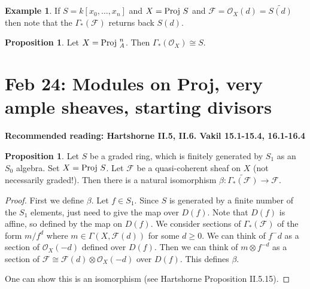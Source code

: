 \documentclass[10pt,reqno]{amsart}
\theoremstyle{definition}
\newtheorem{example}[theorem]{Example}
\newtheorem{proposition}[theorem]{Proposition}
\theoremstyle{remark}
\numberwithin{equation}{section}
\numberwithin{theorem}{section}
\newcommand{\OO}{{\mathcal O}}
\newcommand{\spec}{\textup{Spec }}
\newcommand{\Hom}{\textup{Hom}}
\newcommand{\proj}{\textup{Proj }}
\newcommand{\FF}{{\mathscr F}}
\newcommand{\wt}{\widetilde}
\begin{document}
\begin{example}
If $S = k[x_0,\dots,x_n]$ and $X = \proj S$ and $\FF = \OO_{X}(d) = \wt{S(d)}$ then note that the $\Gamma_*(\FF)$ returns back $S(d)$.
\end{example}

\begin{proposition} Let $X = \proj^n_A$. Then $\Gamma_*(\OO_X) \cong S$.
\end{proposition}
\section{Feb 24: Modules on Proj, very ample sheaves, starting divisors}
\textbf{Recommended reading: Hartshorne II.5, II.6. Vakil 15.1-15.4, 16.1-16.4}

\begin{proposition} Let $S$ be a graded ring, which is finitely generated by $S_1$ as an $S_0$ algebra. Set $X = \proj S$. Let $\FF$ be a quasi-coherent sheaf on $X$ (not necessarily graded!). Then there is a natural isomorphism $\beta: \wt{\Gamma_*(\FF)} \to \FF$.
\end{proposition}
\begin{proof}
First we define $\beta$. Let $f \in S_1$. Since $S$ is generated by a finite number of the $S_1$ elements, just need to give the map over $D(f)$. Note that $D(f)$ is affine, so defined by the map on $D(f)$. %
We consider sections of $\Gamma_*(\FF)$ of the form $m/f^d$ where $m \in \Gamma(X,\FF(d))$ for some $d \ge 0$. We can think of $f^-d$ as a section of $\OO_X(-d)$ defined over $D(f)$. Then we can think of $m \otimes f^{-d}$ as a section of $\FF \cong \FF(d) \otimes \OO_X(-d)$ over $D(f)$. This defines $\beta$.

One can show this is an isomorphism (see Hartshorne Proposition II.5.15).
\end{proof}
\end{document}
